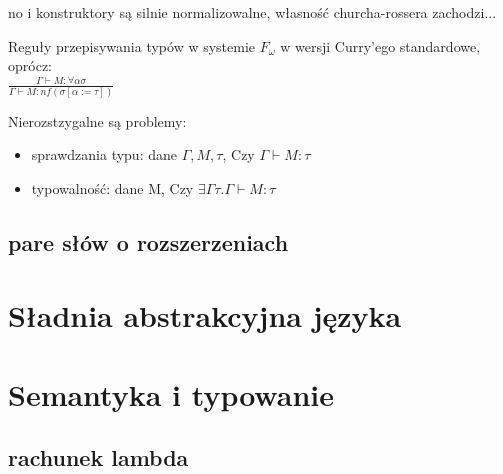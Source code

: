 \documentclass[11pt,leqno]{article}
\begin{document}
no i konstruktory są silnie normalizowalne, własność churcha-rossera zachodzi...

\begin{theorem}
Reguły przepisywania typów w systemie $F_{\omega}$ w wersji Curry'ego standardowe, oprócz: \\

$\frac{\Gamma \vdash M : \forall \alpha \sigma}{\Gamma \vdash M : nf(\sigma [ \alpha := \tau ])}$

\end{theorem}


Nierozstzygalne są problemy:
    \begin{itemize}
        \item sprawdzania typu: dane $\Gamma, M, \tau$, Czy $\Gamma \vdash M : \tau$
        \item typowalność: dane M, Czy $\exists \Gamma \tau . \Gamma \vdash M : \tau$
    \end{itemize}


\subsection{pare słów o rozszerzeniach}


\section{Sładnia abstrakcyjna języka}
\setcounter{equation}{0}



\section{Semantyka i typowanie}                                 
\setcounter{equation}{0}


\subsection{rachunek lambda}
\end{document}
